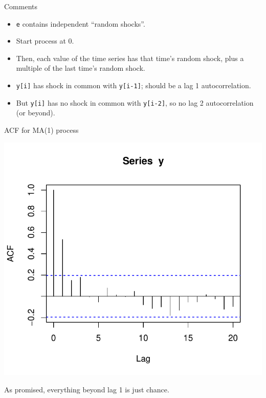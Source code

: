 \begin{frame}[fragile]{Comments}
  
  \begin{itemize}
\item \texttt{e} contains independent ``random shocks''. 
\item Start process at 0. 
\item Then, each value of the time series has that time's random shock, plus a multiple of the last time's random shock. 
\item \texttt{y[i]} has shock in common with \texttt{y[i-1]}; should be a lag 1 autocorrelation. 
\item But \texttt{y[i]} has no shock in common with \texttt{y[i-2]},
  so no lag 2 autocorrelation (or beyond).

  \end{itemize}
  
\end{frame}

\begin{frame}[fragile]{ACF for MA(1) process}
  
\begin{knitrout}
\color{fgcolor}\begin{kframe}
\begin{alltt}
\end{alltt}
\end{kframe}
\includegraphics[width=\maxwidth]{figure/sassuolo-1} 

\end{knitrout}

As promised, everything beyond lag 1 is just chance.

\end{frame}


